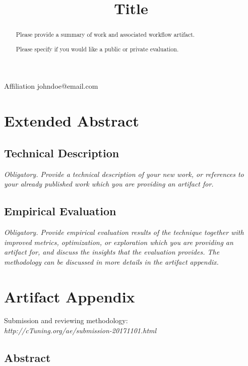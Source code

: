 \documentclass{sigplanconf}
\begin{document}

\title{Title}

{Affiliation}
{johndoe@email.com}

\maketitle

\begin{abstract}
Please provide a summary of work and associated workflow artifact.

Please specify if you would like a public or private evaluation.
\end{abstract}

\section{Extended Abstract}

\subsection{Technical Description}
{\em Obligatory. Provide a technical description of your new work, 
or references to your already published work which you are providing an artifact for.}

\subsection{Empirical Evaluation}
{\em Obligatory. Provide empirical evaluation results of the technique together with improved metrics, 
optimization, or exploration which you are providing an artifact for, and discuss the insights 
that the evaluation provides. The methodology can be discussed in more details in the artifact appendix.}

\newpage

\appendix
\section{Artifact Appendix}

Submission and reviewing methodology: \\
{\em http://cTuning.org/ae/submission-20171101.html}

\subsection{Abstract}
\end{document}
